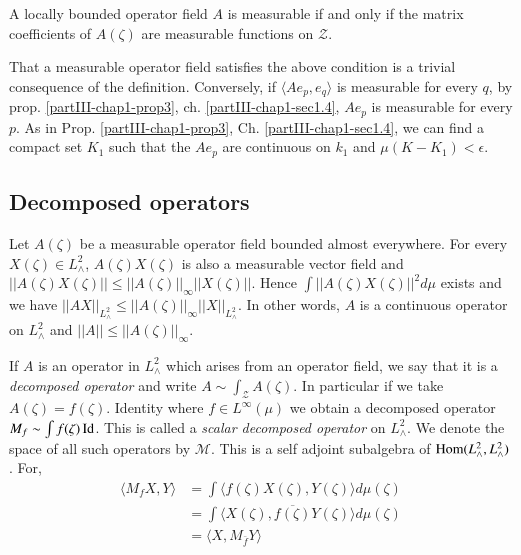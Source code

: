 \begin{proposition}\label{partIII-chap1-prop6}%
A locally bounded operator field $A$ is measurable if and only if
  the matrix coefficients of $A(\zeta)$ are measurable functions on  
$\mathcal{Z}$. 
\end{proposition}

That a measurable operator field satisfies the above condition is a
trivial consequence of the definition. Conversely, if $ \langle
Ae_p,e_q \rangle$ is measurable for every $q$, by
prop. \ref{partIII-chap1-prop3}, ch. \ref{partIII-chap1-sec1.4}, 
$Ae_p$ is measurable for every $p$. As in
Prop. \ref{partIII-chap1-prop3}, Ch. \ref{partIII-chap1-sec1.4}, we
can find 
a compact set $K_1$ such that the  $Ae_p$ are continuous on $k_1$ and
$\mu(K-K_1)<\epsilon$.    

\subsection{Decomposed operators}\label{partIII-chap1-sec1.8}%

Let $A(\zeta)$ be a measurable operator field bounded almost
everywhere. For every $X (\zeta)\in L^2_\wedge$, $A(\zeta) X (\zeta)$
is also a measurable vector field and $|| A (\zeta) X (\zeta) || \le||
A(\zeta)||_ \infty|| X(\zeta)||$. Hence $\int || A (\zeta)X(\zeta)||^2
d\mu$ exists and we have $|| AX ||_{L_\wedge^2} \le || A
(\zeta)||_\infty|| X ||_{L^2_\wedge}$. 
In other words, $A$ is a continuous operator on $L^2_\wedge$ and $||
A || \le || A (\zeta)||_ \infty$. 

If $A$ is an operator in $L^2_\wedge$ which arises from an operator
field, we say that it is a {\em decomposed operator} and write $A\sim
\int_{\mathcal{Z}}A(\zeta)$. In particular if we take
$A(\zeta)=f(\zeta)$.  
Identity where $f\in L^\infty(\mu)$ we obtain a decomposed operator
$M_f \sim \int f(\zeta) \operatorname{Id}$. This is called a {\em scalar
decomposed\pageoriginale 
  operator} on $L^{2}_{\wedge}$. We denote the space of all such
operators by $\mathscr{M}$. This is a self adjoint subalgebra of $\operatorname{Hom}
(L^{2}_{\wedge}, L^{2}_{\wedge})$. For, 
\begin{align*}
\langle{M_f X, Y} \rangle &= \int \langle f(\zeta)
X(\zeta),Y(\zeta)\rangle d \mu (\zeta) \\ 
&=  \int 
\langle X(\zeta), \overline{f(\zeta)}Y(\zeta)\rangle d\mu(\zeta)\\ 
&= \langle X, M_{\bar{f}}Y\rangle 
\end{align*}

